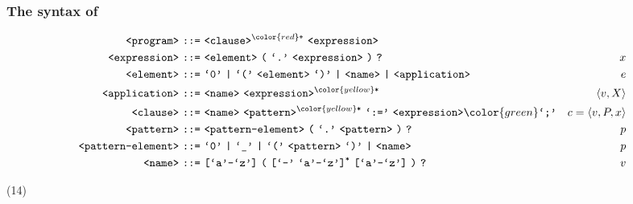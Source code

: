 \begin{frame}

\frametitle{The syntax of \D{}}

\setcounter{equation}{0}

\begin{align*}
\nonterm{program}\ \textt{::=}&\ \nonterm{clause}^{\color{red}\textt{+}}
\ \nonterm{expression}
& \\
\nonterm{expression}\ \textt{::=}&\ \nonterm{element}\ \textt{(}\ \term{.}
\ \nonterm{expression}\ \textt{)}\ \textt{?}
& x\\
\nonterm{element}\ \textt{::=}&\ \term{0}\ \textt{|}\ \term{(}
\ \nonterm{element}\ \term{)}\ \textt{|}\ \nonterm{name}\ \textt{|}
\ \nonterm{application}
& e\\
\nonterm{application}\ \textt{::=}&\ \nonterm{name}
\ \nonterm{expression}^{\color{yellow}\textt{*}}
& \left\langle v,X \right\rangle \\
\nonterm{clause}\ \textt{::=}&\ \nonterm{name}
\ \nonterm{pattern}^{\color{yellow}\textt{*}}\ \term{:=}
\ \nonterm{expression}{\color{green}\term{;}}
& c=\left\langle v, P, x \right\rangle \\
\nonterm{pattern}\ \textt{::=}&\ \nonterm{pattern-element}\ \textt{(}
\ \term{.}\ \nonterm{pattern}\ \textt{)}\ \textt{?}
& p\\
\nonterm{pattern-element}\ \textt{::=}&\ \term{0}\ \textt{|}\ \term{\_}
\ \textt{|}\ \term{(}\ \nonterm{pattern}\ \term{)}\ \textt{|}\ \nonterm{name}
& p\\
\nonterm{name}\ \textt{::=}&\ \textt{[}\term{a}\mathmono{-}\term{z}\textt{]}
\ \textt{(}\ \textt{[}\term{-}\ \term{a}\mathmono{-}\term{z}\textt{]}^\textt{*}
\ \textt{[}\term{a}\mathmono{-}\term{z}\textt{]}\ \textt{)}\ \textt{?}
& v
\end{align*}

(14)


\end{frame}
